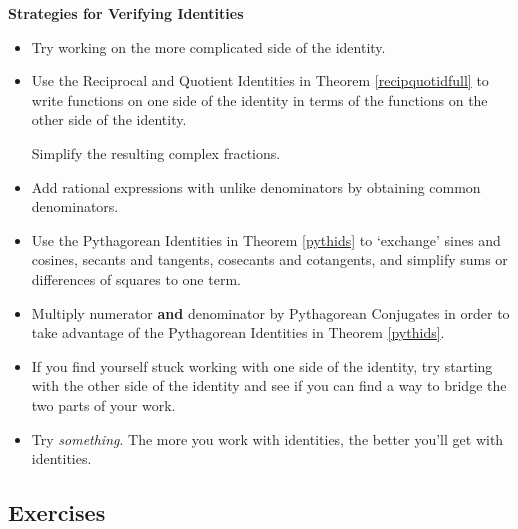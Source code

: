 \documentclass{ximera}
\begin{document}
\label{IdentityHelp}

\colorbox{ResultColor}{\bbm

\medskip

\centerline{\textbf{Strategies for Verifying Identities}} 

\begin{itemize}

\item  Try working on the more complicated side of the identity.

\item Use the Reciprocal and Quotient Identities in Theorem \ref{recipquotidfull} to write functions on one side of the identity in terms of the functions on the other side of the identity.  

\smallskip

Simplify the resulting complex fractions.

\item Add rational expressions with unlike denominators by obtaining common denominators.

\item  Use the Pythagorean Identities in Theorem \ref{pythids} to `exchange' sines and cosines, secants and tangents, cosecants and cotangents, and simplify sums or differences of squares to one term. 

\item Multiply numerator \textbf{and} denominator by Pythagorean
Conjugates in order to take advantage of the Pythagorean Identities in  Theorem \ref{pythids}.

\item If you find yourself stuck working with one side of the identity, try starting with the other side of the identity and see if you can find a way to bridge the two parts of your work.

\item  Try \textit{something}.  The more you work with identities, the better you'll get with identities.

\smallskip


\end{itemize}

\ebm}

\newpage

\subsection{Exercises}



\closegraphsfile
\end{document}
